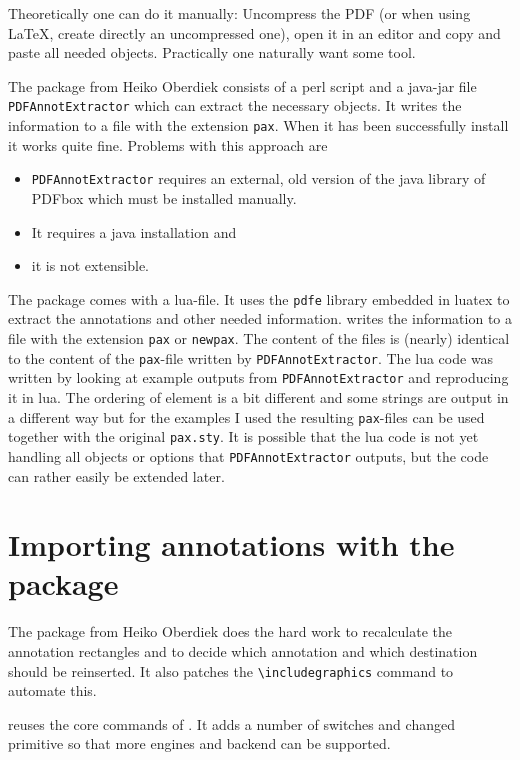 \documentclass[DIV=12,parskip=half-,bibliography=totoc]{scrartcl}
\begin{document}
Theoretically one can do it manually: Uncompress the PDF (or when using \LaTeX, create directly an uncompressed one), open it in an editor and copy and paste all needed objects. Practically one naturally want some tool.

The  package from Heiko Oberdiek consists of a perl script and a java-jar file \texttt{PDFAnnotExtractor} which can extract the necessary objects. It writes the information to a file with the extension \texttt{pax}.
When it has been successfully install it works quite fine. Problems with this approach are
\begin{itemize}
\item \texttt{PDFAnnotExtractor} requires an external, old version of the java library of PDFbox which must be installed manually.
\item It requires a java installation and
\item it is not extensible.
\end{itemize}

The  package comes with a lua-file. It uses the \texttt{pdfe} library embedded in luatex to extract the annotations and other needed information.  writes the information to a file with the extension \texttt{pax} or \texttt{newpax}. The content of the files is (nearly) identical to the content of the \texttt{pax}-file written by \texttt{PDFAnnotExtractor}. The lua code was written by looking at example outputs from \texttt{PDFAnnotExtractor} and reproducing it in lua. The ordering of element is a bit different and some strings are output in a different way but for the examples I used the resulting \texttt{pax}-files can be used together with the original \texttt{pax.sty}. It is possible that the lua code is not yet handling all objects or options that \texttt{PDFAnnotExtractor} outputs, but the code can rather easily be extended later.


\section{Importing annotations with the  package}

The  package from Heiko Oberdiek does the hard work to recalculate the annotation rectangles and to decide which annotation and which destination should be reinserted. It also patches the \verb+\includegraphics+ command to automate this. 

 reuses the core commands of . It adds a number of switches and changed primitive so that more engines and backend can be supported.
\end{document}
